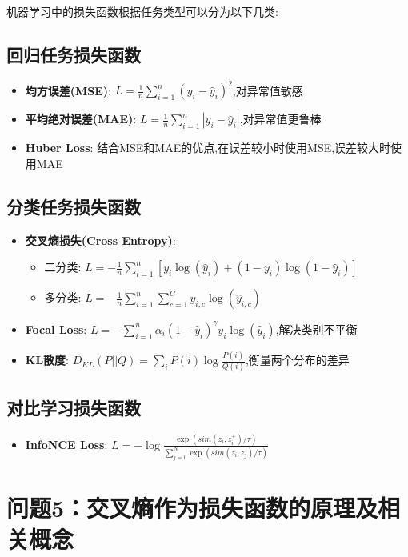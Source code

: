 \documentclass[UTF8]{ctexart}
\begin{document}
机器学习中的损失函数根据任务类型可以分为以下几类:

\subsection{回归任务损失函数}
\begin{itemize}
    \item \textbf{均方误差(MSE)}: $L = \frac{1}{n}\sum_{i=1}^{n}(y_i - \hat{y}_i)^2$,对异常值敏感
    \item \textbf{平均绝对误差(MAE)}: $L = \frac{1}{n}\sum_{i=1}^{n}|y_i - \hat{y}_i|$,对异常值更鲁棒
    \item \textbf{Huber Loss}: 结合MSE和MAE的优点,在误差较小时使用MSE,误差较大时使用MAE
\end{itemize}

\subsection{分类任务损失函数}
\begin{itemize}
    \item \textbf{交叉熵损失(Cross Entropy)}: 
    \begin{itemize}
        \item 二分类: $L = -\frac{1}{n}\sum_{i=1}^{n}[y_i\log(\hat{y}_i) + (1-y_i)\log(1-\hat{y}_i)]$
        \item 多分类: $L = -\frac{1}{n}\sum_{i=1}^{n}\sum_{c=1}^{C}y_{i,c}\log(\hat{y}_{i,c})$
    \end{itemize}
    \item \textbf{Focal Loss}: $L = -\sum_{i=1}^{n}\alpha_i(1-\hat{y}_i)^{\gamma}y_i\log(\hat{y}_i)$,解决类别不平衡
    \item \textbf{KL散度}: $D_{KL}(P||Q) = \sum_{i}P(i)\log\frac{P(i)}{Q(i)}$,衡量两个分布的差异
\end{itemize}

\subsection{对比学习损失函数}
\begin{itemize}
    \item \textbf{InfoNCE Loss}: $L = -\log\frac{\exp(sim(z_i, z_i^+)/\tau)}{\sum_{j=1}^{N}\exp(sim(z_i, z_j)/\tau)}$
\end{itemize}

\section{问题5：交叉熵作为损失函数的原理及相关概念}
\end{document}
